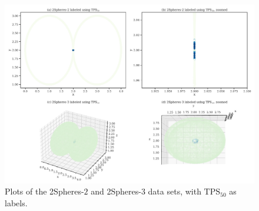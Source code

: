\begin{figure}[H]
    \centering
    \includegraphics[width=\textwidth]{thesis/figures/two-spheres-2d-3d-tps-scores.pdf}
    \caption{Plots of the 2Spheres-$2$ and 2Spheres-$3$ data sets, with $\text{TPS}_{50}$ as labels.}
    \label{fig:two-spheres-2d-3d-tps-scores}
\end{figure}

